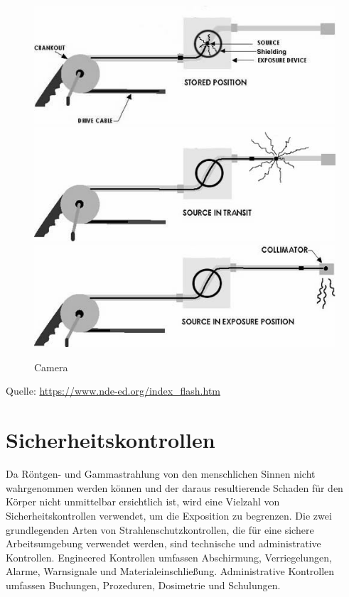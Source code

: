 \begin{figure}[htb]
\centering
  \includegraphics[scale=0.4]{img/Gamma1.jpg}\\
  \includegraphics[scale=0.4]{img/Gamma2.jpg}\\
  \includegraphics[scale=0.4]{img/Gamma3.jpg}\\
  \caption{Camera}
  \label{fig:Camera}
\end{figure}
Quelle: \url{https://www.nde-ed.org/index_flash.htm}
\section{Sicherheitskontrollen}
\label{kontrollen}
Da Röntgen- und Gammastrahlung von den menschlichen Sinnen nicht wahrgenommen werden können und der daraus resultierende Schaden für den Körper nicht unmittelbar ersichtlich ist, wird eine Vielzahl von Sicherheitskontrollen verwendet, um die Exposition zu begrenzen. Die zwei grundlegenden Arten von Strahlenschutzkontrollen, die für eine sichere Arbeitsumgebung verwendet werden, sind technische und administrative Kontrollen. Engineered Kontrollen umfassen Abschirmung, Verriegelungen, Alarme, Warnsignale und Materialeinschließung. Administrative Kontrollen umfassen Buchungen, Prozeduren, Dosimetrie und Schulungen.
